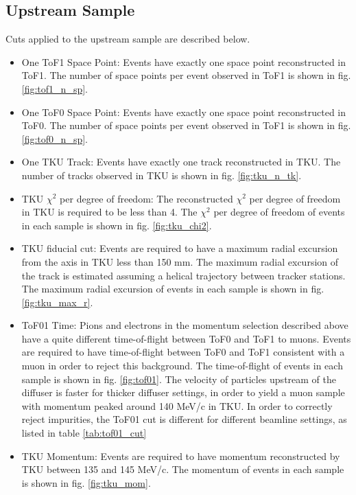 \subsection{Upstream Sample}
Cuts applied to the upstream sample are described below.

\begin{itemize}
\item{One ToF1 Space Point:} Events have exactly one space point reconstructed in
ToF1. The number of space points per event observed in ToF1 is shown in fig. \ref{fig:tof1_n_sp}.
\item{One ToF0 Space Point:} Events have exactly one space point reconstructed in
ToF0. The number of space points per event observed in ToF1 is shown in fig. \ref{fig:tof0_n_sp}.
\item{One TKU Track:} Events have exactly one track reconstructed in TKU. The 
number of tracks observed in TKU is shown in fig. \ref{fig:tku_n_tk}.
\item{TKU $\chi^2$ per degree of freedom:} The reconstructed $\chi^2$ per degree of freedom in TKU is 
required to be less than 4. The $\chi^2$ per degree of freedom of events in 
each sample is shown in fig. \ref{fig:tku_chi2}.
\item{TKU fiducial cut:} Events are required to have a maximum radial excursion 
from the axis in TKU less than 150 mm. The maximum radial excursion of the track 
is estimated assuming a helical trajectory between tracker stations. The maximum 
radial excursion of events in each sample is shown in fig. \ref{fig:tku_max_r}.
\item{ToF01 Time:} Pions and electrons in the momentum selection described above
have a quite different time-of-flight between ToF0 and ToF1 to muons. Events are 
required to have time-of-flight between ToF0 and ToF1 consistent with a muon in
order to reject this background. The time-of-flight of events in each sample is 
shown in fig. \ref{fig:tof01}. The velocity of particles upstream of the diffuser
is faster for thicker diffuser settings, in order to yield a muon sample with
momentum peaked around 140 MeV/c in TKU. In order to correctly reject impurities,
the ToF01 cut is different for different beamline settings, as listed in table 
\ref{tab:tof01_cut}
\item{TKU Momentum:} Events are required to have momentum reconstructed by TKU 
between 135 and 145 MeV/c. The momentum of events in each sample is shown in 
fig. \ref{fig:tku_mom}.

\end{itemize}
